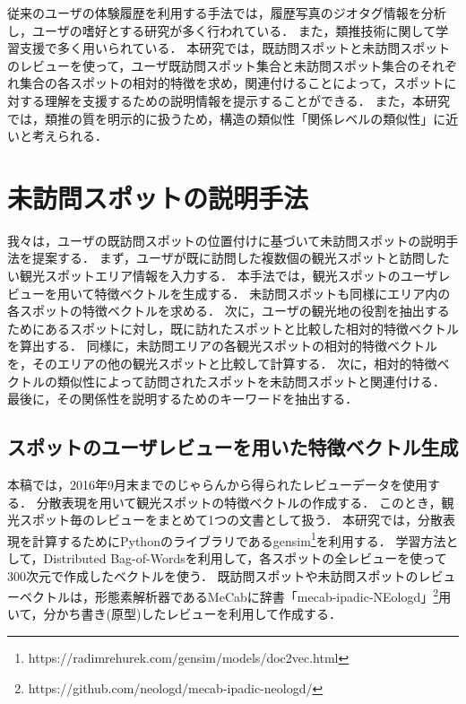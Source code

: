 \documentclass[submit,techrep,noauthor]{ipsj}
\begin{document}
従来のユーザの体験履歴を利用する手法では，履歴写真のジオタグ情報を分析し，ユーザの嗜好とする研究が多く行われている．
また，類推技術に関して学習支援で多く用いられている．
本研究では，既訪問スポットと未訪問スポットのレビューを使って，ユーザ既訪問スポット集合と未訪問スポット集合のそれぞれ集合の各スポットの相対的特徴を求め，関連付けることによって，スポットに対する理解を支援するための説明情報を提示することができる．
また，本研究では，類推の質を明示的に扱うため，構造の類似性「関係レベルの類似性」に近いと考えられる．




\section{未訪問スポットの説明手法}
\label{sec:未訪問スポットの説明手法}
我々は，ユーザの既訪問スポットの位置付けに基づいて未訪問スポットの説明手法を提案する．
まず，ユーザが既に訪問した複数個の観光スポットと訪問したい観光スポットエリア情報を入力する．
本手法では，観光スポットのユーザレビューを用いて特徴ベクトルを生成する．
未訪問スポットも同様にエリア内の各スポットの特徴ベクトルを求める．
次に，ユーザの観光地の役割を抽出するためにあるスポットに対し，既に訪れたスポットと比較した相対的特徴ベクトルを算出する．
同様に，未訪問エリアの各観光スポットの相対的特徴ベクトルを，そのエリアの他の観光スポットと比較して計算する．
次に，相対的特徴ベクトルの類似性によって訪問されたスポットを未訪問スポットと関連付ける．
最後に，その関係性を説明するためのキーワードを抽出する．

\subsection{スポットのユーザレビューを用いた特徴ベクトル生成}
\label{subsec:スポットのレビューから特徴ベクトル生成}
本稿では，2016年9月末までのじゃらんから得られたレビューデータを使用する．
分散表現を用いて観光スポットの特徴ベクトルの作成する．
このとき，観光スポット毎のレビューをまとめて1つの文書として扱う．
本研究では，分散表現を計算するためにPythonのライブラリであるgensim\footnote{https://radimrehurek.com/gensim/models/doc2vec.html}を利用する．
学習方法として，Distributed Bag-of-Wordsを利用して，各スポットの全レビューを使って300次元で作成したベクトルを使う．
既訪問スポットや未訪問スポットのレビューベクトルは，形態素解析器であるMeCab\cite{Codd11}に辞書「mecab-ipadic-NEologd」\footnote{https://github.com/neologd/mecab-ipadic-neologd/}用いて，分かち書き(原型)したレビューを利用して作成する．
\end{document}
